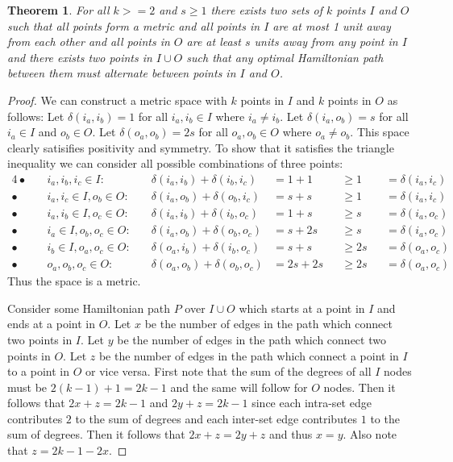 \documentclass{article}
\newtheorem{thm}{Theorem}[section]
\theoremstyle{definition}
\newcommand{\dist}{\delta}
\begin{document}
\begin{thm}
    For all $k>= 2$ and $s \geq 1$ there exists two sets of $k$ points $I$ and $O$ such that all points form a metric and all points in $I$ are at most 1 unit away from each other and all points in $O$ are at least $s$ units away from any point in $I$ and there exists two points in $I \cup O$ such that any optimal Hamiltonian path between them must alternate between points in $I$ and $O$.
\end{thm}
\begin{proof}
    We can construct a metric space with $k$ points in $I$ and $k$ points in $O$ as follows:
    Let $\dist(i_a, i_b) = 1$ for all $i_a, i_b \in I$ where $i_a \neq i_b$.
    Let $\dist(i_a, o_b) = s$ for all $i_a \in I$ and $o_b \in O$.
    Let $\dist(o_a, o_b) = 2s$ for all $o_a, o_b \in O$ where $o_a \neq o_b$.
    This space clearly satisifies positivity and symmetry.
    To show that it satisfies the triangle inequality we can consider all possible combinations of three points:
    \begin{alignat*}{4}
        \bullet\quad & i_a, i_b, i_c \in I:             &\quad \dist(i_a, i_b) + \dist(i_b, i_c) &{}= 1  + 1  &&\geq 1  &&{}= \dist(i_a, i_c) \\
        \bullet\quad & i_a, i_c \in I, o_b \in O:       &\quad \dist(i_a, o_b) + \dist(o_b, i_c) &{}= s  + s  &&\geq 1  &&{}= \dist(i_a, i_c) \\
        \bullet\quad & i_a, i_b \in I, o_c \in O:       &\quad \dist(i_a, i_b) + \dist(i_b, o_c) &{}= 1  + s  &&\geq s  &&{}= \dist(i_a, o_c) \\
        \bullet\quad & i_a \in I, o_b, o_c \in O:       &\quad \dist(i_a, o_b) + \dist(o_b, o_c) &{}= s  + 2s &&\geq s  &&{}= \dist(i_a, o_c) \\
        \bullet\quad & i_b \in I, o_a, o_c \in O:       &\quad \dist(o_a, i_b) + \dist(i_b, o_c) &{}= s + s   &&\geq 2s &&{}= \dist(o_a, o_c) \\
        \bullet\quad & o_a, o_b, o_c \in O:             &\quad \dist(o_a, o_b) + \dist(o_b, o_c) &{}= 2s + 2s &&\geq 2s &&{}= \dist(o_a, o_c)
    \end{alignat*}
    Thus the space is a metric.

    Consider some Hamiltonian path $P$ over $I \cup O$ which starts at a point in $I$ and ends at a point in $O$.
    Let $x$ be the number of edges in the path which connect two points in $I$.
    Let $y$ be the number of edges in the path which connect two points in $O$.
    Let $z$ be the number of edges in the path which connect a point in $I$ to a point in $O$ or vice versa.
    First note that the sum of the degrees of all $I$ nodes must be $2(k-1) + 1 = 2k - 1$ and the same will follow for $O$ nodes.
    Then it follows that $2x + z = 2k - 1$ and $2y + z = 2k - 1$ since each intra-set edge contributes $2$ to the sum of degrees and each inter-set edge contributes $1$ to the sum of degrees.
    Then it follows that $2x + z = 2y + z$ and thus $x = y$.
    Also note that $z = 2k - 1 - 2x$.


\end{proof}
\end{document}
